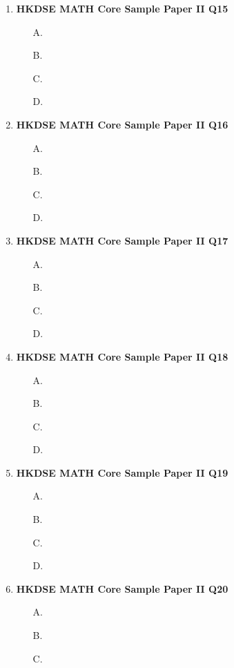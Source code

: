 \documentclass[12pt]{article}
\begin{document}
\begin{enumerate}
	\item \textbf{HKDSE MATH Core Sample Paper II Q15}\\
	\begin{enumerate}
		\item[A.]
		\item[B.]
		\item[C.]
		\item[D.]
	\end{enumerate}
	\item \textbf{HKDSE MATH Core Sample Paper II Q16}\\
	\begin{enumerate}
		\item[A.]
		\item[B.]
		\item[C.]
		\item[D.]
	\end{enumerate}
	\item \textbf{HKDSE MATH Core Sample Paper II Q17}\\
	\begin{enumerate}
		\item[A.]
		\item[B.]
		\item[C.]
		\item[D.]
	\end{enumerate}
	\item \textbf{HKDSE MATH Core Sample Paper II Q18}\\
	\begin{enumerate}
		\item[A.]
		\item[B.]
		\item[C.]
		\item[D.]
	\end{enumerate}
	\item \textbf{HKDSE MATH Core Sample Paper II Q19}\\
	\begin{enumerate}
		\item[A.]
		\item[B.]
		\item[C.]
		\item[D.]
	\end{enumerate}
	\item \textbf{HKDSE MATH Core Sample Paper II Q20}\\
	\begin{enumerate}
		\item[A.]
		\item[B.]
		\item[C.]

\end{enumerate}
\end{enumerate}
\end{document}
